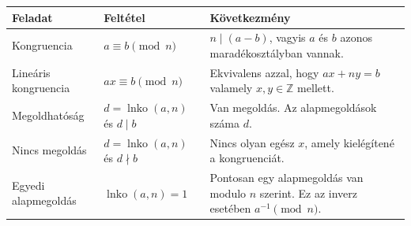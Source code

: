 \begingroup
\setlength{\tabcolsep}{4pt}
\begin{tabularx}{\textwidth}{L{0.24\textwidth}L{0.28\textwidth}X}
\toprule
Feladat & Feltétel & Következmény \\
\midrule
Kongruencia & $a\equiv b\pmod n$ & $n\mid(a-b)$, vagyis $a$ és $b$ azonos maradékosztályban vannak. \\
Lineáris kongruencia & $ax\equiv b\pmod n$ & Ekvivalens azzal, hogy $ax+ny=b$ valamely $x,y\in\mathbb{Z}$ mellett. \\
Megoldhatóság & $d=\operatorname{lnko}(a,n)$ és $d\mid b$ & Van megoldás. Az alapmegoldások száma $d$. \\
Nincs megoldás & $d=\operatorname{lnko}(a,n)$ és $d\nmid b$ & Nincs olyan egész $x$, amely kielégítené a kongruenciát. \\
Egyedi alapmegoldás & $\operatorname{lnko}(a,n)=1$ & Pontosan egy alapmegoldás van modulo $n$ szerint. Ez az inverz esetében $a^{-1}\pmod n$. \\
\bottomrule
\end{tabularx}
\endgroup
